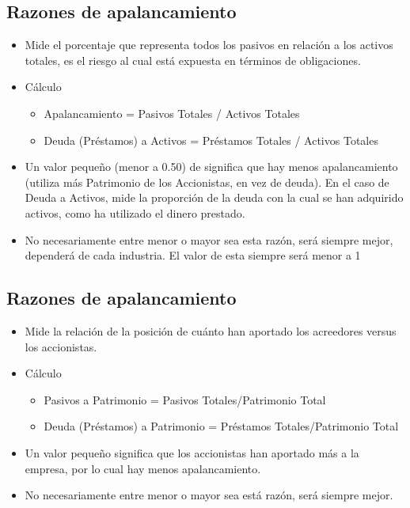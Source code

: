 \subsection{Razones de apalancamiento}
\begin{itemize}
    \item  Mide el porcentaje que representa todos los pasivos en relación a los activos totales, es el riesgo al 
    cual está expuesta en términos de obligaciones. 
    \item Cálculo 
    \begin{itemize}
        \item Apalancamiento  =   Pasivos Totales / Activos Totales
        \item Deuda (Préstamos) a Activos =  Préstamos Totales /  
        Activos Totales 
    \end{itemize}

    \item Un  valor  pequeño  (menor  a  0.50)  de  significa  que  hay  menos  apalancamiento  (utiliza  más 
    Patrimonio de los Accionistas, en vez de deuda). En el caso de Deuda a Activos, mide la proporción 
    de la deuda con la cual se han adquirido activos, como ha utilizado el dinero prestado. 
     
    \item No necesariamente entre menor o mayor sea esta razón, será siempre mejor, dependerá de cada 
    industria. El valor de esta siempre será menor a 1
\end{itemize}

\subsection{Razones de apalancamiento}

\begin{itemize}
    \item Mide  la  relación  de  la  posición  de  cuánto  han  aportado  los  acreedores  versus  los 
    accionistas. 
    \item Cálculo 
    \begin{itemize}
        \item Pasivos a Patrimonio =  Pasivos Totales/Patrimonio Total
        \item  Deuda (Préstamos) a Patrimonio =  Préstamos Totales/Patrimonio Total 
    \end{itemize}
 
   \item Un valor pequeño significa que los accionistas han aportado más a la empresa, por lo cual hay menos apalancamiento. 
    \item No necesariamente entre menor o mayor sea está razón, será siempre mejor.
\end{itemize}


